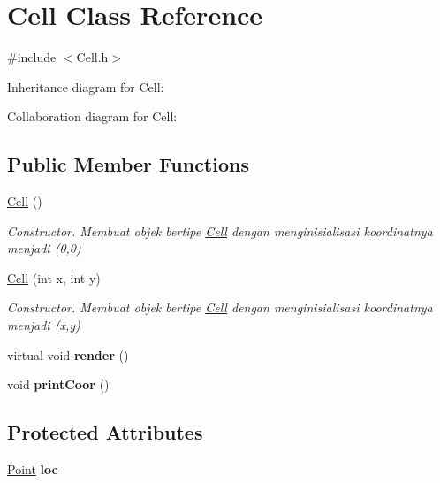 \hypertarget{classCell}{}\section{Cell Class Reference}
\label{classCell}


{\ttfamily \#include $<$Cell.\+h$>$}



Inheritance diagram for Cell\+:


Collaboration diagram for Cell\+:
\subsection*{Public Member Functions}
\begin{DoxyCompactItemize}
\item 
\hyperlink{classCell_a394510643e8664cf12b5efaf5cb99f71}{Cell} ()\hypertarget{classCell_a394510643e8664cf12b5efaf5cb99f71}{}\label{classCell_a394510643e8664cf12b5efaf5cb99f71}

\begin{DoxyCompactList}\small\item\em Constructor. Membuat objek bertipe \hyperlink{classCell}{Cell} dengan menginisialisasi koordinatnya menjadi (0,0) \end{DoxyCompactList}\item 
\hyperlink{classCell_aa39ad04eeebb7bf00d592ad36640337e}{Cell} (int x, int y)
\begin{DoxyCompactList}\small\item\em Constructor. Membuat objek bertipe \hyperlink{classCell}{Cell} dengan menginisialisasi koordinatnya menjadi (x,y) \end{DoxyCompactList}\item 
virtual void {\bfseries render} ()\hypertarget{classCell_a3c55fdf9c9a14cd07e210a2a3fb102ac}{}\label{classCell_a3c55fdf9c9a14cd07e210a2a3fb102ac}

\item 
void {\bfseries print\+Coor} ()\hypertarget{classCell_a184dee133b16168d2ea242d20db79576}{}\label{classCell_a184dee133b16168d2ea242d20db79576}

\end{DoxyCompactItemize}
\subsection*{Protected Attributes}
\begin{DoxyCompactItemize}
\item 
\hyperlink{classPoint}{Point} {\bfseries loc}\hypertarget{classCell_a6955983511c6709d8f5b82b4ba6edb77}{}\label{classCell_a6955983511c6709d8f5b82b4ba6edb77}

\end{DoxyCompactItemize}


